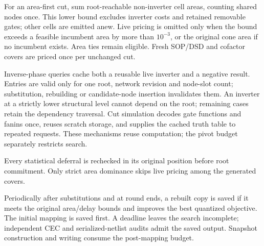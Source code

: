 For an area-first cut, sum root-reachable non-inverter cell areas, counting shared nodes once. This lower bound excludes inverter costs and retained removable gates; other cells are emitted anew. Live pricing is omitted only when the bound exceeds a feasible incumbent area by more than $10^{-3}$, or the original cone area if no incumbent exists. Area ties remain eligible. Fresh SOP/DSD and cofactor covers are priced once per unchanged cut.

Inverse-phase queries cache both a reusable live inverter and a negative result. Entries are valid only for one root, network revision and node-slot count; substitution, rebuilding or candidate-node insertion invalidates them. An inverter at a strictly lower structural level cannot depend on the root; remaining cases retain the dependency traversal. Cut simulation decodes gate functions and fanins once, reuses scratch storage, and supplies the cached truth table to repeated requests. These mechanisms reuse computation; the pivot budget separately restricts search.

Every statistical deferral is rechecked in its original position before root commitment. Only strict area dominance skips live pricing among the generated covers.

Periodically after substitutions and at round ends, a rebuilt copy is saved if it meets the original area/delay bounds and improves the best quantized objective. The initial mapping is saved first. A deadline leaves the search incomplete; independent CEC and serialized-netlist audits admit the saved output. Snapshot construction and writing consume the post-mapping budget.
